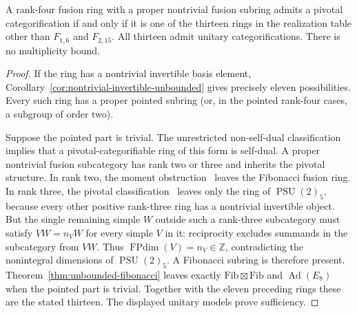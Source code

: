 \begin{theorem}\label{thm:proper-subring-unbounded}
A rank-four fusion ring with a proper nontrivial fusion subring admits a
pivotal categorification if and only if it is one of the thirteen rings
in the realization table other than $F_{1,6}$ and $F_{2,15}$.
All thirteen admit unitary categorifications. There is no multiplicity bound.
\end{theorem}
\begin{proof}
If the ring has a nontrivial invertible basis element,
Corollary~\ref{cor:nontrivial-invertible-unbounded} gives precisely eleven
possibilities. Every such ring has a proper pointed subring (or, in the
pointed rank-four cases, a subgroup of order two).

Suppose the pointed part is trivial. The unrestricted non-self-dual
classification implies that a pivotal-categorifiable ring of this form
is self-dual. A proper nontrivial fusion subcategory has rank two or
three and inherits the pivotal structure. In rank two, the
moment obstruction~\cite[Proposition~\ref{B-prop:ranktwo}]{Finite} leaves the Fibonacci fusion ring.
In rank three, the pivotal classification~\cite{OstrikRank3} leaves
only the ring of $\operatorname{PSU}(2)_5$, because every other positive
rank-three ring has a nontrivial invertible object. But the single
remaining simple $W$ outside such a rank-three subcategory must satisfy
$VW=n_VW$ for every simple $V$ in it: reciprocity excludes summands in
the subcategory from $VW$. Thus $\operatorname{FPdim}(V)=n_V\in\mathbb Z$,
contradicting the nonintegral dimensions of $\operatorname{PSU}(2)_5$.
A Fibonacci subring is therefore present.
Theorem~\ref{thm:unbounded-fibonacci} leaves exactly
$\mathrm{Fib}\boxtimes\mathrm{Fib}$ and $\operatorname{Ad}(E_8)$
when the pointed part is trivial. Together with the eleven preceding
rings these are the stated thirteen. The displayed unitary models prove
sufficiency.
\end{proof}

